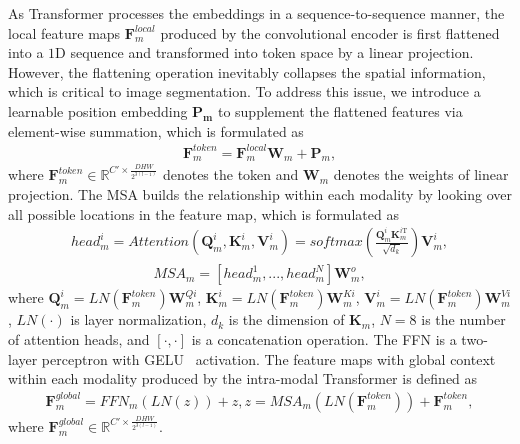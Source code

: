 \documentclass[runningheads]{llncs}
\begin{document}
As Transformer processes the embeddings in a sequence-to-sequence manner, the local feature maps $\mathbf{F}^{local}_m$ produced by the convolutional encoder is first flattened into a $1$D sequence and transformed into token space by a linear projection. However, the flattening operation inevitably collapses the spatial information, which is critical to image segmentation. To address this issue, we introduce a learnable position embedding $\mathbf{P_m}$ to supplement the flattened features via element-wise summation, which is formulated as
\begin{equation}
	\begin{aligned}
	    \mathbf{F}^{token}_m = \mathbf{F}^{local}_m\mathbf{W}_m + \mathbf{P}_m,
	\end{aligned}
\end{equation}
where $\mathbf{F}^{token}_m \in \mathbb{R}^{C' \times \frac{DHW}{2^{3(l-1)}}}$ denotes the token and $\mathbf{W}_m$ denotes the weights of linear projection. The MSA builds the relationship within each modality by looking over all possible locations in the feature map, which is formulated as
\begin{equation}
	\begin{aligned}
	    head^i_m = Attention(\mathbf{Q}^i_m,\mathbf{K}^i_m,\mathbf{V}^i_m) = softmax(\frac{\mathbf{Q}^i_m\mathbf{K}^{i\mathrm{T}}_m}{\sqrt{d_k}})\mathbf{V}^i_m,
	\end{aligned}
\end{equation}
\begin{equation}
	\begin{aligned}
	    MSA_m = [head^1_m, ..., head^N_m]\mathbf{W}^o_m,
	\end{aligned}
\end{equation}
where $\mathbf{Q}^i_m=LN(\mathbf{F}^{token}_m)\mathbf{W}^{Qi}_m$, $\mathbf{K}^i_m=LN(\mathbf{F}^{token}_m)\mathbf{W}^{Ki}_m$,  $\mathbf{V}^i_m=LN(\mathbf{F}^{token}_m)\mathbf{W}^{Vi}_m$, $LN(\cdot)$ is layer normalization, $d_k$ is the dimension of $\mathbf{K}_m$, $N=8$ is the number of attention heads, and $[\cdot, \cdot]$ is a concatenation operation. The FFN is a two-layer perceptron with GELU~\cite{hendrycks2016gaussian} activation. The feature maps with global context within each modality produced by the intra-modal Transformer is defined as
\begin{equation}
	\begin{aligned}
	    \mathbf{F}^{global}_m = FFN_m(LN(z)) + z, z = MSA_m(LN(\mathbf{F}^{token}_m)) + \mathbf{F}^{token}_m,
	\end{aligned}
\end{equation}
where $\mathbf{F}^{global}_m \in \mathbb{R}^{C' \times \frac{DHW}{2^{3(l-1)}}}$.
\end{document}
